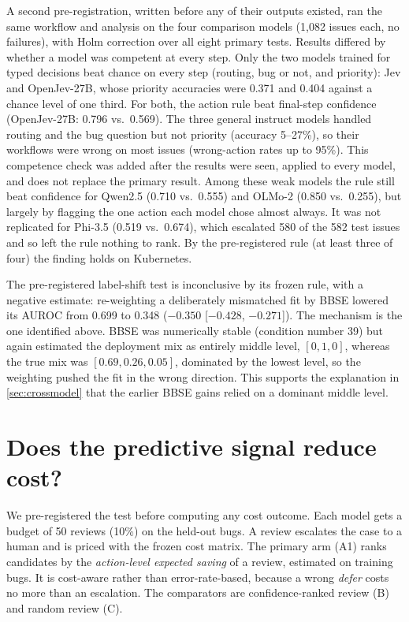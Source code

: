  A second pre-registration, written before any
of their outputs existed, ran the same workflow and analysis on the four
comparison models (1,082 issues each, no failures), with Holm correction
over all eight primary tests. Results differed by whether a model was
competent at every step. Only
the two models trained for typed decisions beat chance on every step
(routing, bug or not, and priority): Jev and OpenJev-27B, whose priority
accuracies were 0.371 and 0.404 against a chance level of one third. For
both, the action rule beat final-step confidence (OpenJev-27B: 0.796
vs.\ 0.569). The three general instruct models handled routing and the
bug question but not priority (accuracy 5--27\%), so their workflows
were wrong on most issues (wrong-action rates up to 95\%). This
competence check was added after the results were seen, applied to
every model, and does not replace the primary result. Among these weak
models the rule still beat confidence for Qwen2.5 (0.710 vs.\ 0.555) and
OLMo-2 (0.850 vs.\ 0.255), but largely by flagging the one action each
model chose almost always. It was not replicated for Phi-3.5 (0.519
vs.\ 0.674), which escalated 580 of the 582 test issues and so left the
rule nothing to rank. By the pre-registered rule (at least three of
four) the finding holds on Kubernetes.

 The pre-registered
label-shift test is inconclusive by its frozen rule, with a negative
estimate: re-weighting a deliberately mismatched fit by BBSE lowered its
AUROC from 0.699 to 0.348 ($-0.350$ [$-0.428$, $-0.271$]). The mechanism
is the one identified above. BBSE was numerically stable (condition
number 39) but again estimated the deployment mix as entirely middle
level, $[0, 1, 0]$, whereas the true mix was $[0.69, 0.26, 0.05]$,
dominated by the lowest level, so the weighting pushed the fit in the
wrong direction. This supports the explanation in \cref{sec:crossmodel}
that the earlier BBSE gains relied on a dominant middle level.

\section{Does the predictive signal reduce cost?}
\label{sec:intervention}

 We pre-registered the test before computing any cost
outcome. Each model gets a budget of 50 reviews (10\%) on the held-out
bugs. A review escalates the case to a human and is priced with the
frozen cost matrix. The primary arm (A1) ranks candidates by the
\emph{action-level expected saving} of a review, estimated on training
bugs. It is cost-aware rather than error-rate-based, because a wrong
\emph{defer} costs no more than an escalation. The comparators are
confidence-ranked review (B) and random review (C).

